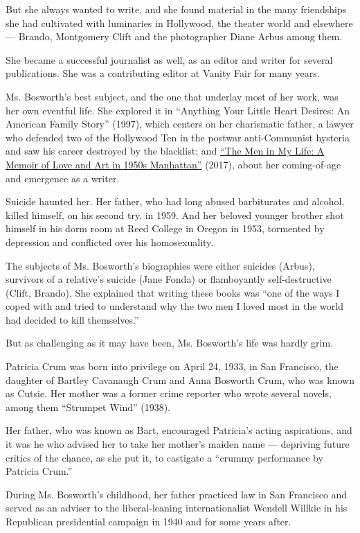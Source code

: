 But she always wanted to write, and she found material in the many
friendships she had cultivated with luminaries in Hollywood, the theater
world and elsewhere --- Brando, Montgomery Clift and the photographer
Diane Arbus among them.

She became a successful journalist as well, as an editor and writer for
several publications. She was a contributing editor at Vanity Fair for
many years.

Ms. Bosworth's best subject, and the one that underlay most of her work,
was her own eventful life. She explored it in ``Anything Your Little
Heart Desires: An American Family Story'' (1997), which centers on her
charismatic father, a lawyer who defended two of the Hollywood Ten in
the postwar anti-Communist hysteria and saw his career destroyed by the
blacklist; and
\href{https://www.nytimes3xbfgragh.onion/2017/01/24/books/review-patricia-bosworth-men-in-my-life.html}{``The
Men in My Life: A Memoir of Love and Art in 1950s Manhattan''} (2017),
about her coming-of-age and emergence as a writer.

Suicide haunted her. Her father, who had long abused barbiturates and
alcohol, killed himself, on his second try, in 1959. And her beloved
younger brother shot himself in his dorm room at Reed College in Oregon
in 1953, tormented by depression and conflicted over his homosexuality.

The subjects of Ms. Bosworth's biographies were either suicides (Arbus),
survivors of a relative's suicide (Jane Fonda) or flamboyantly
self-destructive (Clift, Brando). She explained that writing these books
was ``one of the ways I coped with and tried to understand why the two
men I loved most in the world had decided to kill themselves.''

But as challenging as it may have been, Ms. Bosworth's life was hardly
grim.

Patricia Crum was born into privilege on April 24, 1933, in San
Francisco, the daughter of Bartley Cavanaugh Crum and Anna Bosworth
Crum, who was known as Cutsie. Her mother was a former crime reporter
who wrote several novels, among them ``Strumpet Wind'' (1938).

Her father, who was known as Bart, encouraged Patricia's acting
aspirations, and it was he who advised her to take her mother's maiden
name --- depriving future critics of the chance, as she put it, to
castigate a ``crummy performance by Patricia Crum.''

During Ms. Bosworth's childhood, her father practiced law in San
Francisco and served as an adviser to the liberal-leaning
internationalist Wendell Willkie in his Republican presidential campaign
in 1940 and for some years after.

